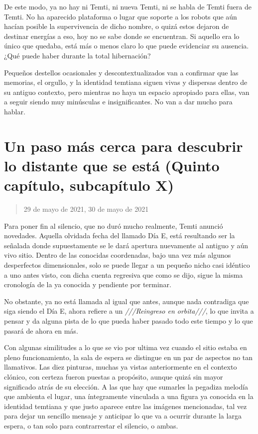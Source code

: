 \documentclass[
  spanish,
]{book}
\begin{document}
De este modo, ya no hay ni Temti, ni nueva Temti, ni se habla de Temti fuera de Temti. No ha aparecido plataforma o lugar que soporte a los robots que aún hacían posible la supervivencia de dicho nombre, o quizá estos dejaron de destinar energías a eso, hoy no se sabe donde se encuentran. Si aquello era lo único que quedaba, está más o menos claro lo que puede evidenciar su ausencia. ¿Qué puede haber durante la total hibernación?

Pequeños destellos ocasionales y descontextualizados van a confirmar que las memorias, el orgullo, y la identidad temtiana siguen vivas y dispersas dentro de su antiguo contexto, pero mientras no haya un espacio apropiado para ellas, van a seguir siendo muy minúsculas e insignificantes. No van a dar mucho para hablar.

\hypertarget{un-paso-muxe1s-cerca-para-descubrir-lo-distante-que-se-estuxe1-quinto-capuxedtulo-subcapuxedtulo-x}{%
\section{Un paso más cerca para descubrir lo distante que se está (Quinto capítulo, subcapítulo X)}\label{un-paso-muxe1s-cerca-para-descubrir-lo-distante-que-se-estuxe1-quinto-capuxedtulo-subcapuxedtulo-x}}

\begin{quote}
29 de mayo de 2021, 30 de mayo de 2021
\end{quote}

Para poner fin al silencio, que no duró mucho realmente, Temti anunció novedades. Aquella olvidada fecha del llamado Día E, está resultando ser la señalada donde supuestamente se le dará apertura nuevamente al antiguo y aún vivo sitio. Dentro de las conocidas coordenadas, bajo una vez más algunos desperfectos dimensionales, solo se puede llegar a un pequeño nicho casi idéntico a uno antes visto, con dicha cuenta regresiva que como se dijo, sigue la misma cronología de la ya conocida y pendiente por terminar.

No obstante, ya no está llamada al igual que antes, aunque nada contradiga que siga siendo el Día E, ahora refiere a un \emph{///Reingreso en orbita///}, lo que invita a pensar y da alguna pista de lo que pueda haber pasado todo este tiempo y lo que pasará de ahora en más.

Con algunas similitudes a lo que se vio por ultima vez cuando el sitio estaba en pleno funcionamiento, la sala de espera se distingue en un par de aspectos no tan llamativos. Las diez pinturas, muchas ya vistas anteriormente en el contexto clónico, con certeza fueron puestas a propósito, aunque quizá sin mayor significado atrás de su elección. A las que hay que sumarles la pegadiza melodía que ambienta el lugar, una íntegramente vinculada a una figura ya conocida en la identidad temtiana y que justo aparece entre las imágenes mencionadas, tal vez para dejar un sencillo mensaje y anticipar lo que va a ocurrir durante la larga espera, o tan solo para contrarrestar el silencio, o ambas.
\end{document}
